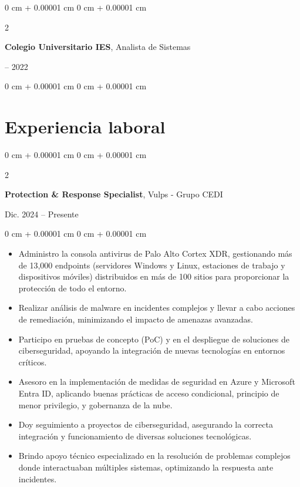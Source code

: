 \documentclass[10pt, letterpaper]{article}
\newenvironment{highlights}{
    \begin{itemize}[
        topsep=0.10 cm,
        parsep=0.10 cm,
        partopsep=0pt,
        itemsep=0pt,
        leftmargin=0 cm + 10pt
    ]
}{
    \end{itemize}
} %
\newenvironment{onecolentry}{
    \begin{adjustwidth}{
        0 cm + 0.00001 cm
    }{
        0 cm + 0.00001 cm
    }
}{
    \end{adjustwidth}
} %
\newenvironment{twocolentry}[2][]{
    \onecolentry
    \def\secondColumn{#2}
    \setcolumnwidth{\fill, 4.5 cm}
    \begin{paracol}{2}
}{
    \switchcolumn \raggedleft \secondColumn
    \end{paracol}
    \endonecolentry
} %
\begin{document}
\begin{twocolentry}{
    2021 – 2022
}
    \textbf{Colegio Universitario IES}, Analista de Sistemas
\end{twocolentry}

\vspace{0.10 cm}
\begin{onecolentry}
    \begin{highlights}
    \end{highlights}
\end{onecolentry}




    
   \section{Experiencia laboral}
\begin{twocolentry}{
    Dic. 2024 – Presente
}
    \textbf{Protection \& Response Specialist}, Vulps - Grupo CEDI
\end{twocolentry}

\vspace{0.10 cm}
\begin{onecolentry}
    \begin{highlights}
         \item Administro la consola antivirus de Palo Alto Cortex XDR, gestionando más de 13,000 endpoints (servidores Windows y Linux, estaciones de trabajo y dispositivos móviles) distribuidos en más de 100 sitios para proporcionar la protección de todo el entorno.
        \item Realizar análisis de malware en incidentes complejos y llevar a cabo acciones de remediación, minimizando el impacto de amenazas avanzadas.
        \item Participo en pruebas de concepto (PoC) y en el despliegue de soluciones de ciberseguridad, apoyando la integración de nuevas tecnologías en entornos críticos.
        \item Asesoro en la implementación de medidas de seguridad en Azure y Microsoft Entra ID, aplicando buenas prácticas de acceso condicional, principio de menor privilegio, y gobernanza de la nube.
        \item Doy seguimiento a proyectos de ciberseguridad, asegurando la correcta integración y funcionamiento de diversas soluciones tecnológicas.
        \item Brindo apoyo técnico especializado en la resolución de problemas complejos donde interactuaban múltiples sistemas, optimizando la respuesta ante incidentes.
    \end{highlights}
\end{onecolentry}
\end{document}

